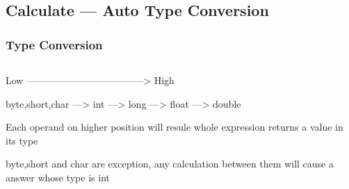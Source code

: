 \documentclass[en, 11pt, xcolor=dvipsnames]{beamer}
\begin{document}
\subsection{Calculate --- Auto Type Conversion}
\begin{frame}[fragile]
	\frametitle{Type Conversion}


	\begin{columns}[c]
		\begin{column}{0.9\textwidth}

			{\center
				{
					Low  ------------------------------------> High

					byte,short,char —> int —> long —> float —> double
				}
			}

			\bigskip %

			Each operand on higher position will resule whole
			expression returns a value in its type

			byte,short and char are exception,
			any calculation between them will cause a answer whose type is int

		\end{column}
	\end{columns}

\end{frame}
\end{document}
